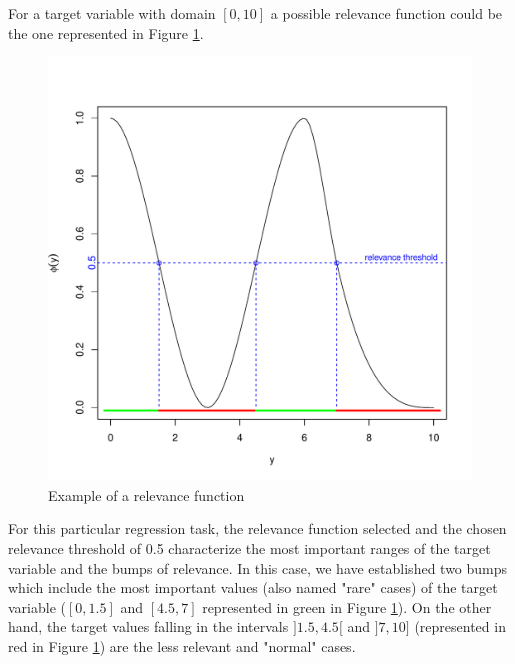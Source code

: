 \documentclass[10pt,a4paper]{article}\usepackage[]{graphicx}\usepackage[]{color}
\makeatletter
\def\maxwidth{ %
  \ifdim\Gin@nat@width>\linewidth
    \linewidth
  \else
    \Gin@nat@width
  \fi
}
\newenvironment{knitrout}{}{} %
\makeatother
\begin{document}
For a target variable with domain $[0,10]$ a possible relevance function could be the one represented in Figure \ref{fig:relev_ex}.

\begin{knitrout}\footnotesize
{}\color{fgcolor}\begin{figure}

{\centering \includegraphics[width=\maxwidth]{figures/UBL-relev_ex-1} 

}

\caption[Example of a relevance function]{Example of a relevance function}\label{fig:relev_ex}
\end{figure}


\end{knitrout}

For this particular regression task, the relevance function selected and the chosen relevance threshold of 0.5 characterize the most important ranges of the target variable and the bumps of relevance. In this case, we have established two bumps which include the most important values (also named "rare" cases) of the target variable ($[0, 1.5]$ and $[4.5, 7]$ represented in green in Figure \ref{fig:relev_ex}). On the other hand, the target values falling in the intervals $]1.5, 4.5[$ and $]7,10]$ (represented in red in Figure \ref{fig:relev_ex}) are the less relevant and "normal" cases.
\end{document}

